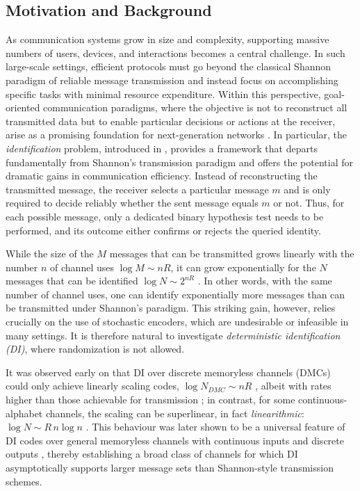 \documentclass[10pt,conference]{IEEEtran}
\newcommand{\1}{\mathds{1}}
\begin{document}
\subsection{Motivation and Background}\label{ssec:motivation}
As communication systems grow in size and complexity, supporting massive numbers of users, devices, and interactions becomes a central challenge. In such large-scale settings, efficient protocols must go beyond the classical Shannon paradigm of reliable message transmission \cite{Shannon:TheoryCommunication} and instead focus on accomplishing specific tasks with minimal resource expenditure. Within this perspective, goal-oriented communication paradigms, where the objective is not to reconstruct all transmitted data but to enable particular decisions or actions at the receiver, arise as a promising foundation for next-generation networks \cite{Goal_Oriented_Coms,6G_Book,6G_Book_2}.
%
In particular, the \emph{identification} problem, introduced in \cite{AD:ID_ViaChannels}, provides a framework that departs fundamentally from Shannon’s transmission paradigm and offers the potential for dramatic gains in communication efficiency. Instead of reconstructing the transmitted message, the receiver selects a particular message $m$ and is only required to decide reliably whether the sent message equals $m$ or not. Thus, for each possible message, only a dedicated binary hypothesis test needs to be performed, and its outcome either confirms or rejects the queried identity. 

While the size of the $M$ messages that can be transmitted grows linearly with the number $n$ of channel uses $\log M\sim nR$, it can grow exponentially for the $N$ messages that can be identified $\log N\sim 2^{nR}$ \cite{AD:ID_ViaChannels, HanVerdu:ID, RI_gaussian, Wiretap_ID, broadcast_ID, hashing_ID, CR_ID}. In other words, with the same number of channel uses, one can identify exponentially more messages than can be transmitted under Shannon’s paradigm. This striking gain, however, relies crucially on the use of stochastic encoders, which are undesirable or infeasible in many settings. It is therefore natural to investigate \emph{deterministic identification (DI)}, where randomization is not allowed.

It was observed early on that DI over discrete memoryless channels (DMCs) could only achieve linearly scaling codes, $\log N_{DMC}\sim nR$ \cite{AD:ID_ViaChannels,AC:DI}, albeit with rates higher than those achievable for transmission \cite{SPBD:DI_power}; in contrast, for some continuous-alphabet channels, the scaling can be superlinear, in fact \emph{linearithmic}: $\log N\sim R\,n\log n$ \cite{SPBD:DI_power,DI-poisson_mc,DI-fading}. This behaviour was later shown to be a universal feature of DI codes over general memoryless channels with continuous inputs and discrete outputs \cite{CDBW:DI_classical}, thereby establishing a broad class of channels for which DI asymptotically supports larger message sets than Shannon-style transmission schemes. 
\end{document}
